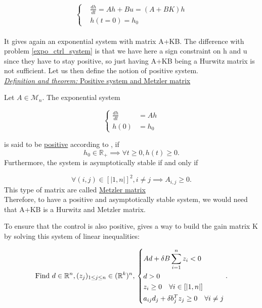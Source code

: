 \documentclass[12pt]{article}
\begin{document}
\begin{equation}\label{pos_ctrl_system}
\left\{
\begin{aligned}
    &\frac{dh}{dt} = Ah+Bu = (A+BK)h\\
    &h(t=0) = h_0
\end{aligned}
\right. 
\end{equation}
\\

It gives again an exponential system with matrix A+KB. The difference with problem \eqref{expo_ctrl_system} is that we have here a sign constraint on h and u since they have to stay positive, so just having A+KB being a Hurwitz matrix is not sufficient. Let us then define the notion of positive system.
\\

\underline{\textit{Definition and theorem:} Positive system and Metzler matrix}

Let $A \in \mathcal{M}_n.$ The exponential system 

\begin{equation}
\left\{
\begin{aligned}
\frac{dh}{dt}&= Ah\\
h(0) &= h_0 
\end{aligned}
\right.
\end{equation}

is said to be \underline{positive} according to \cite{pos_ctrl_paper}, if 
\begin{equation}
    h_0 \in \mathbb{R}_+ \implies \forall t \geq 0, h(t) \geq 0.
\end{equation}
Furthermore, the system is asymptotically stable if and only if 

\begin{equation*}
    \forall (i,j) \in [|1,n|]^2, i\neq j \implies A_{i,j} \geq 0.
\end{equation*}
This type of matrix are called \underline{Metzler matrix}
\\

Therefore, to have a positive and asymptotically stable system, we would need that A+KB is a Hurwitz and Metzler matrix. 

To ensure that the control is also positive, \cite{pos_ctrl_paper} gives a way to build the gain matrix K by solving this system of linear inequalities: 


\begin{equation}\label{linear_inequalities_pos_ctrl}
\text{Find } d\in \mathbb{R}^n,(z_j)_{1\leq j \leq n}\in (\mathbb{R}^k)^n, \quad \\
    \left\{ 
\begin{aligned}
&Ad+\delta B\sum_{i=1}^n z_i <0 \\
&d>0\\
&z_i \geq 0 \quad \forall i \in  [|1,n|]\\
&a_{ij}d_j + \delta b_j^Tz_j\geq 0 \quad \forall i\neq j 
\end{aligned}
\right. .
\end{equation}
\end{document}
